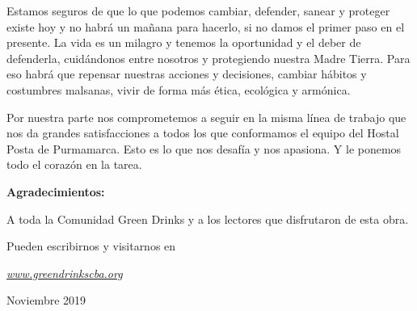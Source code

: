 \documentclass[
]{article}
\begin{document}
Estamos seguros de que lo que podemos cambiar, defender, sanear y
proteger existe hoy y no habrá un mañana para hacerlo, si no damos el
primer paso en el presente. La vida es un milagro y tenemos la
oportunidad y el deber de defenderla, cuidándonos entre nosotros y
protegiendo nuestra Madre Tierra. Para eso habrá que repensar nuestras
acciones y decisiones, cambiar hábitos y costumbres malsanas, vivir de
forma más ética, ecológica y armónica.

Por nuestra parte nos comprometemos a seguir en la misma línea de
trabajo que nos da grandes satisfacciones a todos los que conformamos el
equipo del Hostal Posta de Purmamarca. Esto es lo que nos desafía y nos
apasiona. Y le ponemos todo el corazón en la tarea.

\cleardoublepage

\textbf{Agradecimientos:}

A toda la Comunidad Green Drinks y a los lectores que disfrutaron de
esta obra.

Pueden escribirnos y visitarnos en

\href{http://www.greendrinkscba.org}{\emph{www.greendrinkscba.org}}

Noviembre 2019
\end{document}
